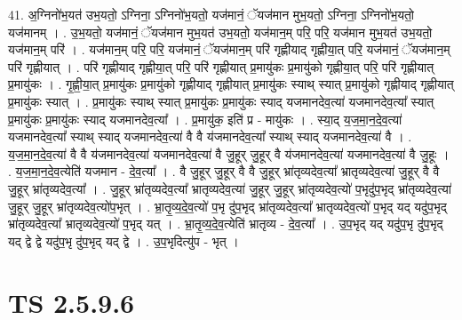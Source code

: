 \documentclass[17pt]{extarticle}
\begin{document}
41. अ॒ग्निनो॑भ॒यत॑ उभ॒यतो॒ ऽग्निना॒ ऽग्निनो॑भ॒यतो॒ यज॑मानं॒ ॅयज॑मान मुभ॒यतो॒ ऽग्निना॒ ऽग्निनो॑भ॒यतो॒ यज॑मानम् । . उ॒भ॒यतो॒ यज॑मानं॒ ॅयज॑मान मुभ॒यत॑ उभ॒यतो॒ यज॑मान॒म् परि॒ परि॒ यज॑मान मुभ॒यत॑ उभ॒यतो॒ यज॑मान॒म् परि॑ । . यज॑मान॒म् परि॒ परि॒ यज॑मानं॒ ॅयज॑मान॒म् परि॑ गृह्णीयाद् गृह्णीया॒त् परि॒ यज॑मानं॒ ॅयज॑मान॒म् परि॑ गृह्णीयात् । . परि॑ गृह्णीयाद् गृह्णीया॒त् परि॒ परि॑ गृह्णीयात् प्र॒मायु॑कः प्र॒मायु॑को गृह्णीया॒त् परि॒ परि॑ गृह्णीयात् प्र॒मायु॑कः । . गृ॒ह्णी॒या॒त् प्र॒मायु॑कः प्र॒मायु॑को गृह्णीयाद् गृह्णीयात् प्र॒मायु॑कः स्याथ् स्यात् प्र॒मायु॑को गृह्णीयाद् गृह्णीयात् प्र॒मायु॑कः स्यात् । . प्र॒मायु॑कः स्याथ् स्यात् प्र॒मायु॑कः प्र॒मायु॑कः स्याद् यजमानदेव॒त्या॑ यजमानदेव॒त्या᳚ स्यात् प्र॒मायु॑कः प्र॒मायु॑कः स्याद् यजमानदेव॒त्या᳚ । . प्र॒मायु॑क॒ इति॑ प्र - मायु॑कः । . स्या॒द् य॒ज॒मा॒न॒दे॒व॒त्या॑ यजमानदेव॒त्या᳚ स्याथ् स्याद् यजमानदेव॒त्या॑ वै वै य॑जमानदेव॒त्या᳚ स्याथ् स्याद् यजमानदेव॒त्या॑ वै । . य॒ज॒मा॒न॒दे॒व॒त्या॑ वै वै य॑जमानदेव॒त्या॑ यजमानदेव॒त्या॑ वै जु॒हूर् जु॒हूर् वै य॑जमानदेव॒त्या॑ यजमानदेव॒त्या॑ वै जु॒हूः । . य॒ज॒मा॒न॒दे॒व॒त्येति॑ यजमान - दे॒व॒त्या᳚ । . वै जु॒हूर् जु॒हूर् वै वै जु॒हूर् भ्रा॑तृव्यदेव॒त्या᳚ भ्रातृव्यदेव॒त्या॑ जु॒हूर् वै वै जु॒हूर् भ्रा॑तृव्यदेव॒त्या᳚ । . जु॒हूर् भ्रा॑तृव्यदेव॒त्या᳚ भ्रातृव्यदेव॒त्या॑ जु॒हूर् जु॒हूर् भ्रा॑तृव्यदेव॒त्यो॑ प॒भृदु॑प॒भृद् भ्रा॑तृव्यदेव॒त्या॑ जु॒हूर् जु॒हूर् भ्रा॑तृव्यदेव॒त्यो॑प॒भृत् । . भ्रा॒तृ॒व्य॒दे॒व॒त्यो॑ प॒भृ दु॑प॒भृद् भ्रा॑तृव्यदेव॒त्या᳚ भ्रातृव्यदेव॒त्यो॑ प॒भृद् यद् यदु॑प॒भृद् भ्रा॑तृव्यदेव॒त्या᳚ भ्रातृव्यदेव॒त्यो॑ प॒भृद् यत् । . भ्रा॒तृ॒व्य॒दे॒व॒त्येति॑ भ्रातृव्य - दे॒व॒त्या᳚ । . उ॒प॒भृद् यद् यदु॑प॒भृ दु॑प॒भृद् यद् द्वे द्वे यदु॑प॒भृ दु॑प॒भृद् यद् द्वे । . उ॒प॒भृदित्यु॑प - भृत् । \newline
\pagebreak
{}
\section*{ TS 2.5.9.6 }
\end{document}
